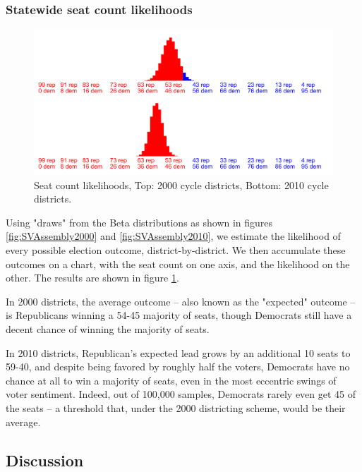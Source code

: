\documentclass[preprint,12pt]{article}
\begin{document}
\subsubsection{Statewide seat count likelihoods}

\begin{figure}[htb!]
    \begin{center}
        \includegraphics[scale=0.25]{../Figures/WI_compared/seats_cropped.png}
        \caption{Seat count likelihoods, Top: 2000 cycle districts, Bottom: 2010 cycle districts.}\label{fig:LikelihoodsSeatCounts}
    \end{center}
\end{figure}
 
Using "draws" from the Beta distributions as shown in figures \ref{fig:SVAssembly2000} and \ref{fig:SVAssembly2010}, we estimate the likelihood of every possible election outcome, district-by-district.
We then accumulate these outcomes on a chart, with the seat count on one axis, and the likelihood on the other.  The results are shown in figure \ref{fig:LikelihoodsSeatCounts}.

In 2000 districts, the average outcome -- also known as the "expected" outcome -- is Republicans winning a 54-45 majority of seats, though Democrats still have a decent chance of winning the majority of seats. 

In 2010 districts, Republican's expected lead grows by an additional 10 seats to 59-40, and despite being favored by roughly half the voters, Democrats have no chance at all to win a majority of seats,  even in the most eccentric swings of voter sentiment.
Indeed, out of 100,000 samples, Democrats rarely even get 45 of the seats -- a threshold that, under the 2000 districting scheme, would be their average.

\subsection{Discussion}
\end{document}
